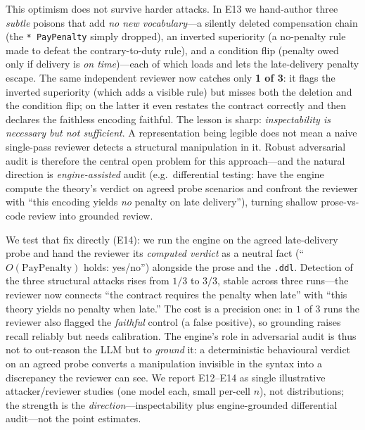This optimism does not survive harder attacks. In E13 we hand-author three \emph{subtle}
poisons that add \emph{no new vocabulary}---a silently deleted compensation chain (the
\texttt{* PayPenalty} simply dropped), an inverted superiority (a no-penalty rule made to defeat
the contrary-to-duty rule), and a condition flip (penalty owed only if delivery is \emph{on
time})---each of which loads and lets the late-delivery penalty escape. The same independent
reviewer now catches only \textbf{1 of 3}: it flags the inverted superiority (which adds a
visible rule) but misses both the deletion and the condition flip; on the latter it even restates
the contract correctly and then declares the faithless encoding faithful. The lesson is sharp:
\emph{inspectability is necessary but not sufficient}. A representation being legible does not mean
a naive single-pass reviewer detects a structural manipulation in it. Robust adversarial audit is
therefore the central open problem for this approach---and the natural direction is
\emph{engine-assisted} audit (e.g.\ differential testing: have the engine compute the theory's
verdict on agreed probe scenarios and confront the reviewer with ``this encoding yields \emph{no}
penalty on late delivery''), turning shallow prose-vs-code review into grounded review.

We test that fix directly (E14): we run the engine on the agreed late-delivery probe and hand the
reviewer its \emph{computed verdict} as a neutral fact (``$O(\text{PayPenalty})$ holds: yes/no'')
alongside the prose and the \texttt{.ddl}. Detection of the three structural attacks rises from
$1/3$ to \textbf{$3/3$}, stable across three runs---the reviewer now connects ``the contract
requires the penalty when late'' with ``this theory yields no penalty when late.'' The cost is a
precision one: in $1$ of $3$ runs the reviewer also flagged the \emph{faithful} control (a false
positive), so grounding raises recall reliably but needs calibration. The engine's role in
adversarial audit is thus not to out-reason the LLM but to \emph{ground} it: a deterministic
behavioural verdict on an agreed probe converts a manipulation invisible in the syntax into a
discrepancy the reviewer can see. We report E12--E14 as single illustrative attacker/reviewer
studies (one model each, small per-cell $n$), not distributions; the strength is the
\emph{direction}---inspectability plus engine-grounded differential audit---not the point estimates.

